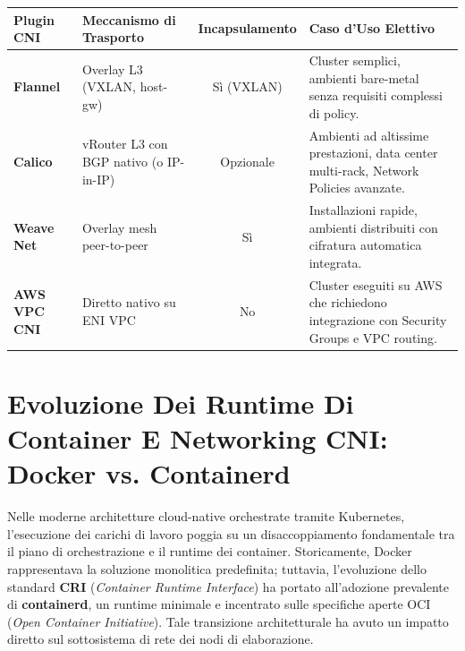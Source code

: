 \documentclass[11pt, a4paper]{article}
\begin{document}
\begin{center}
\begin{tabularx}{\textwidth}{l >{\raggedright\arraybackslash}p{4.2cm} c X}
    \toprule
    \textbf{Plugin CNI} & \textbf{Meccanismo di Trasporto} & \textbf{Incapsulamento} & \textbf{Caso d'Uso Elettivo} \\
    \midrule
    \textbf{Flannel} & Overlay L3 (VXLAN, host-gw) & Sì (VXLAN) & Cluster semplici, ambienti bare-metal senza requisiti complessi di policy. \\
    \addlinespace
    \textbf{Calico} & vRouter L3 con BGP nativo (o IP-in-IP) & Opzionale & Ambienti ad altissime prestazioni, data center multi-rack, Network Policies avanzate. \\
    \addlinespace
    \textbf{Weave Net} & Overlay mesh peer-to-peer & Sì & Installazioni rapide, ambienti distribuiti con cifratura automatica integrata. \\
    \addlinespace
    \textbf{AWS VPC CNI} & Diretto nativo su ENI VPC & No & Cluster eseguiti su AWS che richiedono integrazione con Security Groups e VPC routing. \\
    \bottomrule
\end{tabularx}
\end{center}

\section{Evoluzione Dei Runtime Di Container E Networking CNI: Docker vs. Containerd}

Nelle moderne architetture cloud-native orchestrate tramite Kubernetes, l'esecuzione dei carichi di lavoro poggia su un disaccoppiamento fondamentale tra il piano di orchestrazione e il runtime dei container. Storicamente, Docker rappresentava la soluzione monolitica predefinita; tuttavia, l'evoluzione dello standard \textbf{CRI} (\emph{Container Runtime Interface}) ha portato all'adozione prevalente di \textbf{containerd}, un runtime minimale e incentrato sulle specifiche aperte OCI (\emph{Open Container Initiative}). Tale transizione architetturale ha avuto un impatto diretto sul sottosistema di rete dei nodi di elaborazione.
\end{document}
